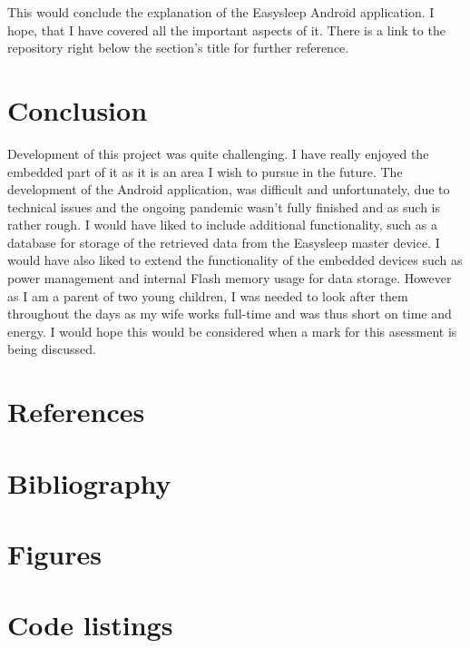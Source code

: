 \documentclass[12pt,a4paper]{article}
\begin{document}
    This would conclude the explanation of the Easysleep Android application. I hope, that I have covered all the important aspects of it. There is a link to the repository right below the section's title for further reference.
    \newpage

    \section{Conclusion}
    Development of this project was quite challenging. I have really enjoyed the embedded part of it as it is an area I wish to pursue in the future. The development of the Android application, was difficult and unfortunately, due to technical issues and the ongoing pandemic wasn't fully finished and as such is rather rough. I would have liked to include additional functionality, such as a database for storage of the retrieved data from the Easysleep master device. I would have also liked to extend the functionality of the embedded devices such as power management and internal Flash memory usage for data storage. However as I am a parent of two young children, I was needed to look after them throughout the days as my wife works full-time and was thus short on time and energy. I would hope this would be considered when a mark for this asessment is being discussed.
    \newpage
    
    \section{References}
    \newpage

    \section{Bibliography}
    \newpage

    \section{Figures}
    \listoffigures
    \newpage

    \section{Code listings}
    \lstlistoflistings
    \newpage
\end{document}
